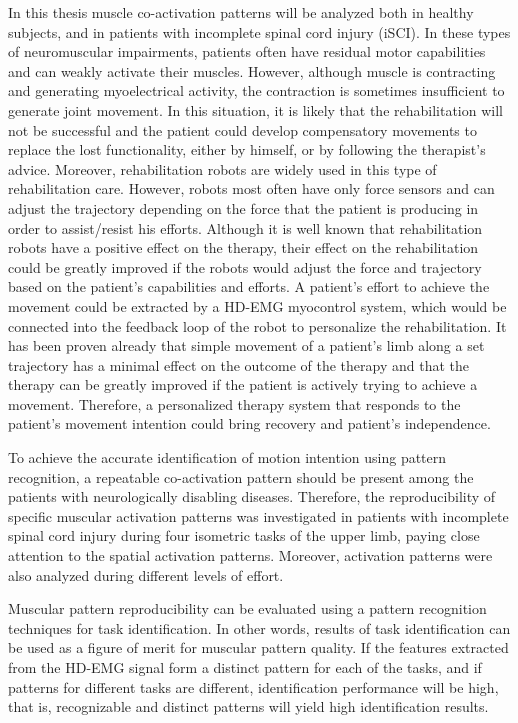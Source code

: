 In this thesis muscle co-activation patterns will be analyzed both in healthy subjects, and in patients with incomplete spinal cord injury (iSCI). In these types of neuromuscular impairments, patients often have residual motor capabilities and can weakly activate their muscles. However, although muscle is contracting and generating myoelectrical activity, the contraction is sometimes insufficient to generate joint movement. In this situation, it is likely that the rehabilitation will not be successful and the patient could develop compensatory movements to replace the lost functionality, either by himself, or by following the therapist's advice. Moreover, rehabilitation robots are widely used in this type of rehabilitation care. However, robots most often have only force sensors and can adjust the trajectory depending on the force that the patient is producing in order to assist/resist his efforts. Although it is well known that rehabilitation robots have a positive effect on the therapy, their effect on the rehabilitation could be greatly improved if the robots would adjust the force and trajectory based on the patient's capabilities and efforts. A patient's effort to achieve the movement could be extracted by a HD-EMG myocontrol system, which would be connected into the feedback loop of the robot to personalize the rehabilitation. It has been proven already that simple movement of a patient's limb along a set trajectory has a minimal effect on the outcome of the therapy and that the therapy can be greatly improved if the patient is actively trying to achieve a movement. Therefore, a personalized therapy system that responds to the patient's movement intention could bring recovery and patient's independence.

To achieve the accurate identification of motion intention using pattern recognition, a repeatable co-activation pattern should be present among the patients with neurologically disabling diseases. Therefore, the reproducibility of specific muscular activation patterns was investigated in patients with incomplete spinal cord injury during four isometric tasks of the upper limb, paying close attention to the spatial activation patterns. Moreover, activation patterns were also analyzed during different levels of effort.

Muscular pattern reproducibility can be evaluated using a pattern recognition techniques for task identification. In other words, results of task identification can be used as a figure of merit for muscular pattern quality. If the features extracted from the HD-EMG signal form a distinct pattern for each of the tasks, and if patterns for different tasks are different, identification performance will be high, that is, recognizable and distinct patterns will yield high identification results.
   
